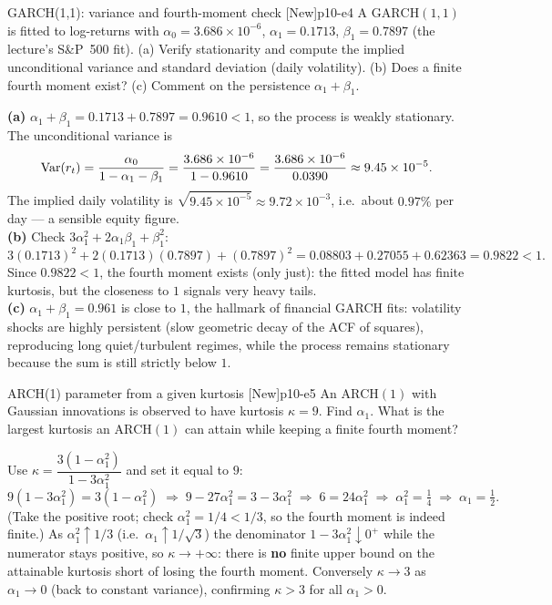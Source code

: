 \begin{exercise}{GARCH(1,1): variance and fourth-moment check \quad\textnormal{[New]}}{p10-e4}
A $\mathrm{GARCH}(1,1)$ is fitted to log-returns with
$\alpha_0=3.686\times10^{-6}$, $\alpha_1=0.1713$, $\beta_1=0.7897$ (the lecture's
S\&P~500 fit). (a) Verify stationarity and compute the implied unconditional
variance and standard deviation (daily volatility). (b) Does a finite fourth
moment exist? (c) Comment on the persistence $\alpha_1+\beta_1$.
\end{exercise}
\begin{solution}
\textbf{(a)} $\alpha_1+\beta_1=0.1713+0.7897=0.9610<1$, so the process is weakly
stationary. The unconditional variance is
\[
\operatorname{Var}(r_t)=\frac{\alpha_0}{1-\alpha_1-\beta_1}
=\frac{3.686\times10^{-6}}{1-0.9610}
=\frac{3.686\times10^{-6}}{0.0390}\approx 9.45\times10^{-5}.
\]
The implied daily volatility is $\sqrt{9.45\times10^{-5}}\approx 9.72\times10^{-3}$,
i.e.\ about $0.97\%$ per day --- a sensible equity figure.\\
\textbf{(b)} Check $3\alpha_1^2+2\alpha_1\beta_1+\beta_1^2$:
\[
3(0.1713)^2+2(0.1713)(0.7897)+(0.7897)^2
=0.08803+0.27055+0.62363=0.9822<1 .
\]
Since $0.9822<1$, the fourth moment exists (only just): the fitted model has
finite kurtosis, but the closeness to $1$ signals very heavy tails.\\
\textbf{(c)} $\alpha_1+\beta_1=0.961$ is close to $1$, the hallmark of financial
GARCH fits: volatility shocks are highly persistent (slow geometric decay of the
ACF of squares), reproducing long quiet/turbulent regimes, while the process
remains stationary because the sum is still strictly below $1$.
\end{solution}

\begin{exercise}{ARCH(1) parameter from a given kurtosis \quad\textnormal{[New]}}{p10-e5}
An $\mathrm{ARCH}(1)$ with Gaussian innovations is observed to have kurtosis
$\kappa=9$. Find $\alpha_1$. What is the largest kurtosis an $\mathrm{ARCH}(1)$
can attain while keeping a finite fourth moment?
\end{exercise}
\begin{solution}
Use $\kappa=\dfrac{3(1-\alpha_1^2)}{1-3\alpha_1^2}$ and set it equal to $9$:
\[
9(1-3\alpha_1^2)=3(1-\alpha_1^2)
\;\Rightarrow\;9-27\alpha_1^2=3-3\alpha_1^2
\;\Rightarrow\;6=24\alpha_1^2
\;\Rightarrow\;\alpha_1^2=\tfrac14
\;\Rightarrow\;\alpha_1=\tfrac12 .
\]
(Take the positive root; check $\alpha_1^2=1/4<1/3$, so the fourth moment is
indeed finite.) As $\alpha_1^2\uparrow1/3$ (i.e.\ $\alpha_1\uparrow1/\sqrt3$) the
denominator $1-3\alpha_1^2\downarrow0^+$ while the numerator stays positive, so
$\kappa\to+\infty$: there is \textbf{no} finite upper bound on the attainable
kurtosis short of losing the fourth moment. Conversely $\kappa\to3$ as
$\alpha_1\to0$ (back to constant variance), confirming $\kappa>3$ for all
$\alpha_1>0$.
\end{solution}


